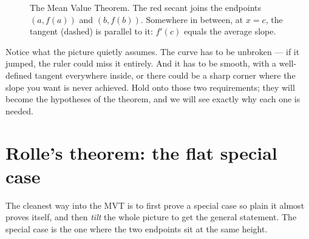 \begin{figure}[H]
\centering
{}
\caption{The Mean Value Theorem. The red secant joins the endpoints
$(a,f(a))$ and $(b,f(b))$. Somewhere in between, at $x=c$, the tangent (dashed) is
parallel to it: $f'(c)$ equals the average slope.}
\label{ch15:fig-mvt}
\end{figure}

Notice what the picture quietly assumes. The curve has to be unbroken --- if it
jumped, the ruler could miss it entirely. And it has to be smooth, with a
well-defined tangent everywhere inside, or there could be a sharp corner where the
slope you want is never achieved. Hold onto those two requirements; they will
become the hypotheses of the theorem, and we will see exactly why each one is
needed.

\section{Rolle's theorem: the flat special case}

The cleanest way into the MVT is to first prove a special case so plain it almost
proves itself, and then \emph{tilt} the whole picture to get the general statement.
The special case is the one where the two endpoints sit at the same height.

